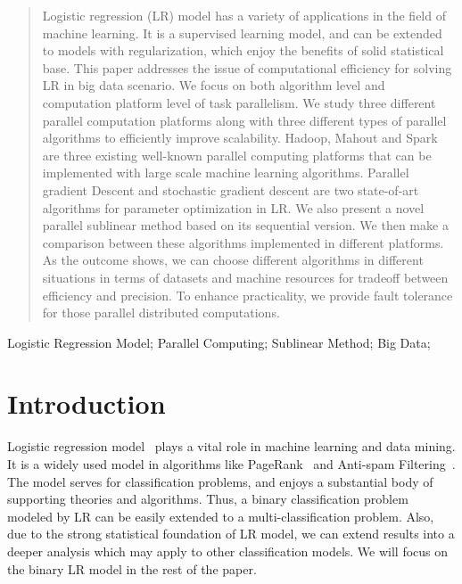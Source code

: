 \documentclass[10pt, conference, compsocconf]{IEEEtran}
\begin{document}
\begin{abstract}
Logistic regression (LR) model has a variety of applications in the field of machine learning.
It is a supervised learning model, and can be extended to models with regularization, which enjoy the benefits of solid statistical base.
This paper addresses the issue of computational efficiency for solving LR in big data scenario.
We focus on both algorithm level and computation platform level of task parallelism.
We study three different parallel computation platforms along with three different types of parallel algorithms to efficiently improve scalability.
Hadoop, Mahout and Spark are three existing well-known parallel computing platforms that can be implemented with large scale machine learning algorithms.
Parallel gradient Descent and stochastic gradient descent are two state-of-art algorithms for parameter optimization in LR.
We also present a novel parallel sublinear method based on its sequential version.
We then make a comparison between these algorithms implemented in different platforms.
As the outcome shows, we can choose different algorithms in different situations in terms of datasets and machine resources for tradeoff between efficiency and precision.
To enhance practicality, we provide fault tolerance for those  parallel distributed computations.
\end{abstract}

\begin{IEEEkeywords}
Logistic Regression Model; Parallel Computing; Sublinear Method; Big Data;
\end{IEEEkeywords}

\section{Introduction} \label{sec:int}
Logistic regression model~\cite{HastieBook:SL} plays a vital role in machine learning and data mining.
It is a widely used model in algorithms like PageRank~\cite{page1999pagerank} and Anti-spam Filtering~\cite{androutsopoulos2000evaluation}.
The model serves for classification problems, and enjoys a substantial body of supporting theories and algorithms.
Thus, a binary classification problem modeled by LR can be easily extended to a multi-classification problem.
Also, due to the strong statistical foundation of LR model, we can extend results into a deeper analysis which may apply to other classification models.
We will focus on the binary LR model in the rest of the paper.
\end{document}
